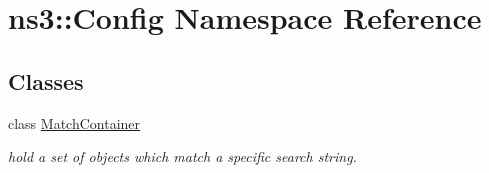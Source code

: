 \hypertarget{namespacens3_1_1Config}{}\section{ns3\+:\+:Config Namespace Reference}
\label{namespacens3_1_1Config}
\subsection*{Classes}
\begin{DoxyCompactItemize}
\item 
class \hyperlink{classns3_1_1Config_1_1MatchContainer}{Match\+Container}
\begin{DoxyCompactList}\small\item\em hold a set of objects which match a specific search string. \end{DoxyCompactList}\end{DoxyCompactItemize}
